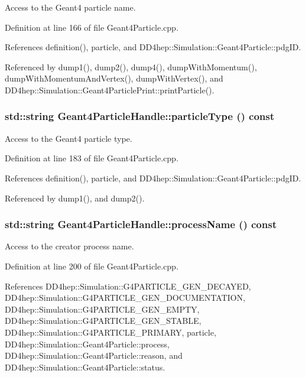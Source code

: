 Access to the Geant4 particle name. 

Definition at line 166 of file Geant4Particle.cpp.

References definition(), particle, and DD4hep::Simulation::Geant4Particle::pdgID.

Referenced by dump1(), dump2(), dump4(), dumpWithMomentum(), dumpWithMomentumAndVertex(), dumpWithVertex(), and DD4hep::Simulation::Geant4ParticlePrint::printParticle().\hypertarget{class_d_d4hep_1_1_simulation_1_1_geant4_particle_handle_a5930424c9e95d4688fb0c0e9ce0965ee}{
\subsubsection[{particleType}]{\setlength{\rightskip}{0pt plus 5cm}std::string Geant4ParticleHandle::particleType () const}}
\label{class_d_d4hep_1_1_simulation_1_1_geant4_particle_handle_a5930424c9e95d4688fb0c0e9ce0965ee}


Access to the Geant4 particle type. 

Definition at line 183 of file Geant4Particle.cpp.

References definition(), particle, and DD4hep::Simulation::Geant4Particle::pdgID.

Referenced by dump1(), and dump2().\hypertarget{class_d_d4hep_1_1_simulation_1_1_geant4_particle_handle_a3ac24454a926713d25ecc8db7595a55b}{
\subsubsection[{processName}]{\setlength{\rightskip}{0pt plus 5cm}std::string Geant4ParticleHandle::processName () const}}
\label{class_d_d4hep_1_1_simulation_1_1_geant4_particle_handle_a3ac24454a926713d25ecc8db7595a55b}


Access to the creator process name. 

Definition at line 200 of file Geant4Particle.cpp.

References DD4hep::Simulation::G4PARTICLE\_\-GEN\_\-DECAYED, DD4hep::Simulation::G4PARTICLE\_\-GEN\_\-DOCUMENTATION, DD4hep::Simulation::G4PARTICLE\_\-GEN\_\-EMPTY, DD4hep::Simulation::G4PARTICLE\_\-GEN\_\-STABLE, DD4hep::Simulation::G4PARTICLE\_\-PRIMARY, particle, DD4hep::Simulation::Geant4Particle::process, DD4hep::Simulation::Geant4Particle::reason, and DD4hep::Simulation::Geant4Particle::status.


